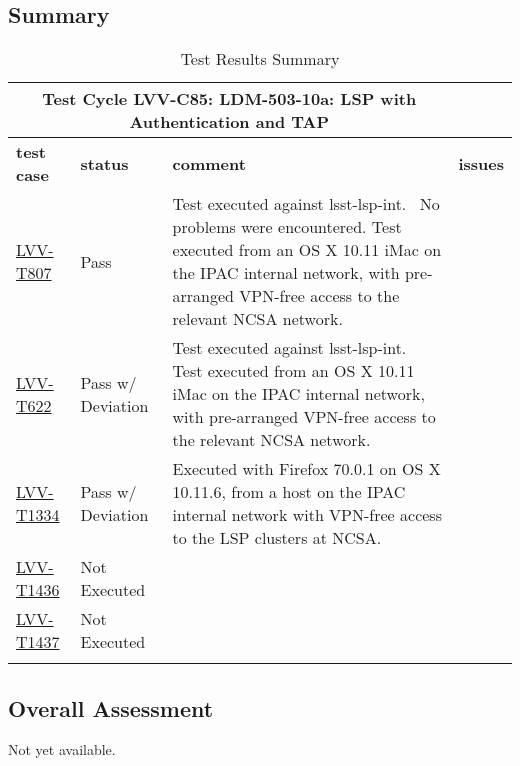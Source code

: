 \documentclass[DM,lsstdraft,STR,toc]{lsstdoc}
\begin{document}
\subsection{Summary}
\label{sect:summarytable}

\begin{longtable}{p{}p{}p{}p{}}
\toprule

  \multicolumn{3}{c}{ Test Cycle {\bf LVV-C85: LDM-503-10a: LSP with Authentication and TAP
 }} \\\hline

  {\bf \footnotesize test case} & {\bf \footnotesize status} & {\bf \footnotesize comment} & {\bf \footnotesize issues} \\\toprule

    \href{https://jira.lsstcorp.org/secure/Tests.jspa#/testCase/LVV-T807}{LVV-T807}
    & Pass & Test executed against lsst-lsp-int. ~No problems were encountered.
Test executed from an OS X 10.11 iMac on the IPAC internal network, with
pre-arranged VPN-free access to the relevant NCSA network.
 &
    \\\hline
    \href{https://jira.lsstcorp.org/secure/Tests.jspa#/testCase/LVV-T622}{LVV-T622}
    & Pass w/ Deviation & Test executed against lsst-lsp-int. ~
Test executed from an OS X 10.11 iMac on the IPAC internal network, with
pre-arranged VPN-free access to the relevant NCSA network.
 &
    \\\hline
    \href{https://jira.lsstcorp.org/secure/Tests.jspa#/testCase/LVV-T1334}{LVV-T1334}
    & Pass w/ Deviation & Executed with Firefox 70.0.1 on OS X 10.11.6, from a host on the IPAC
internal network with VPN-free access to the LSP clusters at NCSA.
 &
    \\\hline
    \href{https://jira.lsstcorp.org/secure/Tests.jspa#/testCase/LVV-T1436}{LVV-T1436}
    & Not Executed &  &
    \\\hline
    \href{https://jira.lsstcorp.org/secure/Tests.jspa#/testCase/LVV-T1437}{LVV-T1437}
    & Not Executed &  &
    \\\hline

\caption{Test Results Summary}
\label{table:summary}
\end{longtable}

\subsection{Overall Assessment}
\label{sect:overallassessment}

Not yet available.
\end{document}
